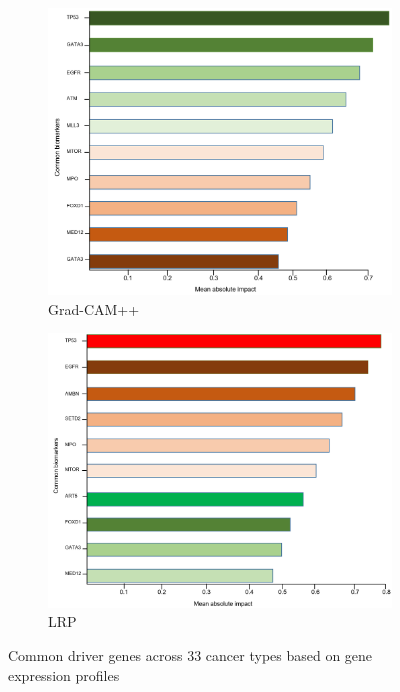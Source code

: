 \begin{figure}[h]
	\centering
	\begin{subfigure}{.48\linewidth}
		\centering
		\includegraphics[scale=0.4]{images/gcam_fi.png}
		\caption{Grad-CAM++}
        \label{fig:comgenegcam}
	\end{subfigure}
	\begin{subfigure}{0.48\linewidth}
		\centering
		\includegraphics[scale=0.4]{images/lrp_fi.png}
		\caption{LRP}
        \label{fig:comgeneglrp}
	\end{subfigure}
	\caption{Common driver genes across 33 cancer types based on gene expression profiles} 
	\label{fig:comgenes}
\end{figure}

